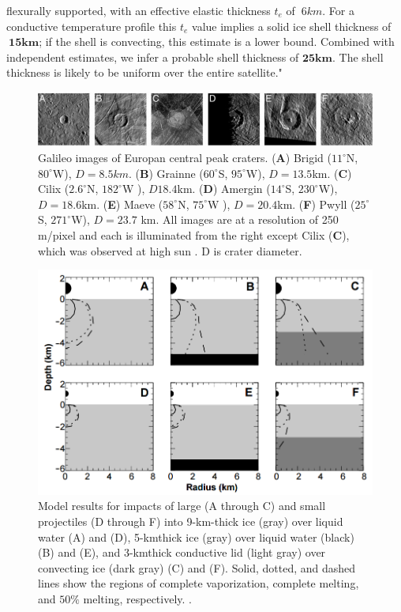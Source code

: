 flexurally supported, with an effective elastic thickness $t_e$ of
$~6km$. For a conductive temperature profile this $t_e$ value
implies a solid ice shell thickness of $\mathbf{~15km}$; if the shell is
convecting, this estimate is a lower bound. Combined with
independent estimates, we infer a probable shell thickness
of $\mathbf{25 km}$. The shell thickness is likely to be uniform over
the entire satellite."\cite{ThermElast}
\begin{figure}[htb]
	\centering
	\includegraphics[width=\textwidth]{figures/Rasmus/Impacts}
	\caption{Galileo images of Europan central peak craters. (\textbf{A}) Brigid ($11^\circ$N, $80^\circ$W), $D=8.5km$. (\textbf{B}) Grainne ($60^\circ$S, $95^\circ$W), $D=13.5$km. (\textbf{C}) Cilix ($2.6^\circ$N, $182^\circ$W ), $D18.4$km. (\textbf{D}) Amergin ($14^\circ$S, $230^\circ$W), $D=18.6$km. (\textbf{E}) Maeve ($58^\circ$N, $75^\circ$W ), $D=20.4$km. (\textbf{F}) Pwyll ($25^\circ$S, $271^\circ$W), $D=23.7$ km. All images are at a resolution of 250 m/pixel and each is illuminated from the right except Cilix (\textbf{C}), which was observed at high sun
	\cite{ThickImpact}. D is crater diameter. \label{fig:ImpactPic}}
\end{figure}
\begin{figure}[htb]
	\centering
	\includegraphics[width=1\textwidth]{figures/Rasmus/Impacts2}
	\caption{Model results for impacts of large (A through C) and small projectiles (D through F) into 9-km-thick ice (gray) over liquid water (A) and (D), 5-kmthick ice (gray) over liquid water (black) (B) and (E), and 3-kmthick conductive lid (light gray) over convecting ice (dark gray) (C) and (F). Solid, dotted, and dashed lines show the regions of complete vaporization, complete melting, and $50\%$ melting, respectively.
	\cite{ThickImpact}.\label{fig:ImpactSim}}
\end{figure}
